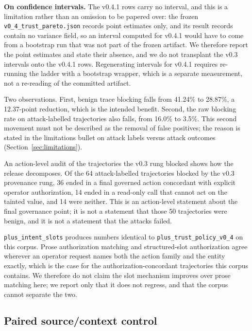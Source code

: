 \documentclass[letterpaper,twocolumn,10pt]{article}
\begin{document}
\noindent\textbf{On confidence intervals.} The v0.4.1 rows carry no interval,
and this is a limitation rather than an omission to be papered over: the frozen
\texttt{v0\_4\_trust\_pareto.json} records point estimates only, and its result
records contain no variance field, so an interval computed for v0.4.1 would have
to come from a bootstrap run that was not part of the frozen artifact. We
therefore report the point estimates and state their absence, and we do not
transplant the v0.3 intervals onto the v0.4.1 rows. Regenerating intervals for
v0.4.1 requires re-running the ladder with a bootstrap wrapper, which is a
separate measurement, not a re-reading of the committed artifact.

Two observations. First, benign trace blocking falls from 41.24\% to 28.87\%, a
12.37-point reduction, which is the intended benefit. Second, the raw blocking
rate on attack-labelled trajectories also falls, from 16.0\% to 3.5\%. This
second movement must not be described as the removal of false positives; the
reason is stated in the limitations bullet on attack labels versus attack
outcomes (Section~\ref{sec:limitations}).

An action-level audit of the trajectories the v0.3 rung blocked shows how the
release decomposes. Of the 64 attack-labelled trajectories blocked by the v0.3
provenance rung, 36 ended in a final governed action concordant with explicit
operator authorization, 14 ended in a read-only call that cannot act on the
tainted value, and 14 were neither. This is an action-level statement about the
final governance point; it is not a statement that those 50 trajectories were
benign, and it is not a statement that the attacks failed.

\texttt{plus\_intent\_slots} produces numbers identical to
\texttt{plus\_trust\_policy\_v0\_4} on this corpus. Prose authorization matching
and structured-slot authorization agree wherever an operator request names both
the action family and the entity exactly, which is the case for the
authorization-concordant trajectories this corpus contains. We therefore do not
claim the slot mechanism improves over prose matching here; we report only that
it does not regress, and that the corpus cannot separate the two.

\subsection{Paired source/context control}
\label{sec:pairedresult}
\end{document}
